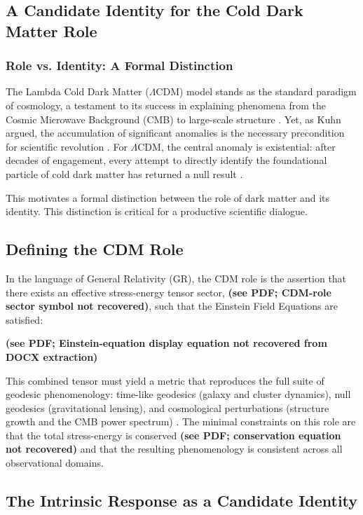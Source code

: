 \subsection{A Candidate Identity for the Cold Dark Matter Role}

\subsubsection{Role vs. Identity: A Formal Distinction}

The Lambda Cold Dark Matter ($\Lambda$CDM) model stands as the standard paradigm of cosmology, a testament to its success in explaining phenomena from the Cosmic Microwave Background (CMB) to large-scale structure \citep{Planck2018VI2020}. Yet, as Kuhn argued, the accumulation of significant anomalies is the necessary precondition for scientific revolution \citep{Kuhn1962}. For $\Lambda$CDM, the central anomaly is existential: after decades of engagement, every attempt to directly identify the foundational particle of cold dark matter has returned a null result \citep{UndagoitiaRauch2016,LZ2023}.

This motivates a formal distinction between the role of dark matter and its identity. This distinction is critical for a productive scientific dialogue.

\subsection{Defining the CDM Role}

In the language of General Relativity (GR), the CDM role is the assertion that there exists an effective stress-energy tensor sector, \textbf{(see PDF; CDM-role sector symbol not recovered)}, such that the Einstein Field Equations are satisfied:

\textbf{(see PDF; Einstein-equation display equation not recovered from DOCX extraction)}

This combined tensor must yield a metric that reproduces the full suite of geodesic phenomenology: time-like geodesics (galaxy and cluster dynamics), null geodesics (gravitational lensing), and cosmological perturbations (structure growth and the CMB power spectrum) \citep{Planck2018VI2020}. The minimal constraints on this role are that the total stress-energy is conserved \textbf{(see PDF; conservation equation not recovered)} and that the resulting phenomenology is consistent across all observational domains.

\subsection{The Intrinsic Response as a Candidate Identity}

